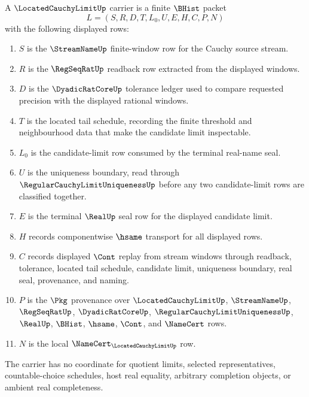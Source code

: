 \begin{definition}
\label{def:located-cauchy-limit-carrier}
A $\LocatedCauchyLimitUp$ carrier is a finite $\BHist$ packet
$$
L=(S,R,D,T,L_0,U,E,H,C,P,N)
$$
with the following displayed rows:
\begin{enumerate}
\item $S$ is the $\StreamNameUp$ finite-window row for the Cauchy source stream.
\item $R$ is the $\RegSeqRatUp$ readback row extracted from the displayed windows.
\item $D$ is the $\DyadicRatCoreUp$ tolerance ledger used to compare requested precision with the displayed rational windows.
\item $T$ is the located tail schedule, recording the finite threshold and neighbourhood data that make the candidate limit inspectable.
\item $L_0$ is the candidate-limit row consumed by the terminal real-name seal.
\item $U$ is the uniqueness boundary, read through $\RegularCauchyLimitUniquenessUp$ before any two candidate-limit rows are classified together.
\item $E$ is the terminal $\RealUp$ seal row for the displayed candidate limit.
\item $H$ records componentwise $\hsame$ transport for all displayed rows.
\item $C$ records displayed $\Cont$ replay from stream windows through readback, tolerance, located tail schedule, candidate limit, uniqueness boundary, real seal, provenance, and naming.
\item $P$ is the $\Pkg$ provenance over $\LocatedCauchyLimitUp$, $\StreamNameUp$, $\RegSeqRatUp$, $\DyadicRatCoreUp$, $\RegularCauchyLimitUniquenessUp$, $\RealUp$, $\BHist$, $\hsame$, $\Cont$, and $\NameCert$ rows.
\item $N$ is the local $\NameCert_{\LocatedCauchyLimitUp}$ row.
\end{enumerate}
The carrier has no coordinate for quotient limits, selected representatives, countable-choice schedules, host real equality, arbitrary completion objects, or ambient real completeness.
\end{definition}


